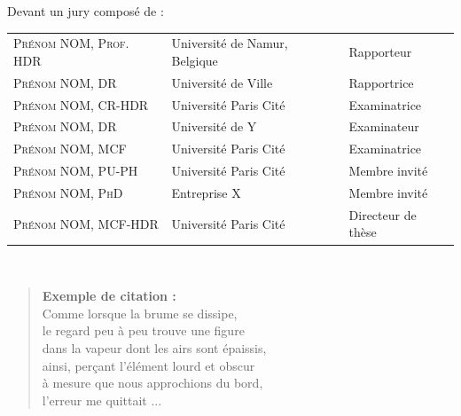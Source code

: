 \documentclass[a4paper,12pt,twoside,english]{book}
\begin{document}
\begin{titlepage}
		\vspace{1cm}
Devant un jury composé de : %
		\begin{center}
			\begin{tabular}{l@{\hskip 1cm}l@{\hskip 1cm}l}
				\textsc{Prénom NOM, Prof. HDR} & Université de Namur, Belgique  & Rapporteur \\
				\textsc{Prénom NOM, DR}  & Université de Ville &Rapportrice \\
				\textsc{Prénom NOM, CR-HDR}  & Université Paris Cité &Examinatrice\\
                \textsc{Prénom NOM, DR}  & Université de Y &Examinateur\\
				\textsc{Prénom NOM, MCF}  &Université Paris Cité  &Examinatrice \\
				\textsc{Prénom NOM, PU-PH}  &Université Paris Cité &Membre invité \\
				\textsc{Prénom NOM, PhD}  &Entreprise X &Membre invité \\
				\textsc{Prénom NOM, MCF-HDR}  &Université Paris Cité &Directeur de thèse \\
			\end{tabular}\\[1cm]
		\end{center}

	\newpage %
	\thispagestyle{empty} %
	\end{titlepage}

\renewcommand{\chaptermark}[1]{\markboth{#1}{}}


\frontmatter %


\clearpage
\vspace*{0.2\textheight}

\begin{quote}
\textbf{Exemple de citation :} \\
Comme lorsque la brume se dissipe, \\ le regard peu à peu trouve une figure\\ dans la vapeur dont les airs sont épaissis, \\ ainsi, perçant l'élément lourd et obscur\\ à mesure que nous approchions du bord, \\l'erreur me quittait ...
\end{quote} \bigbreak
\end{document}
